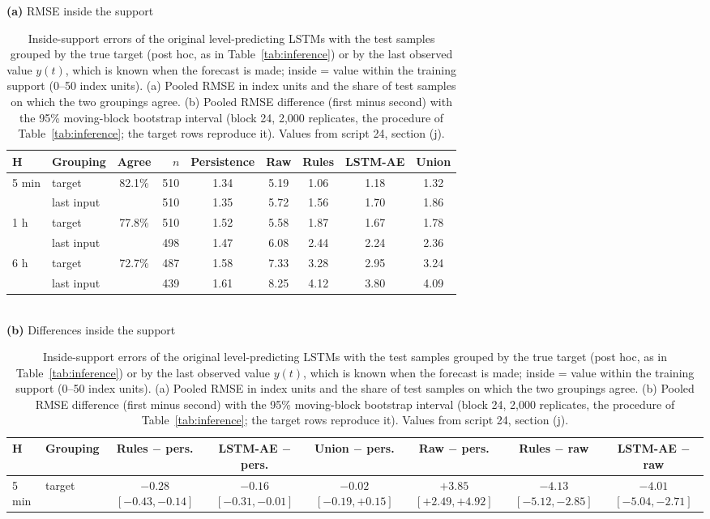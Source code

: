 \begin{table}[!ht]
\centering
\small
\caption{Inside-support errors of the original level-predicting LSTMs with the test samples grouped by the true target (post hoc, as in Table~\ref{tab:inference}) or by the last observed value $y(t)$, which is known when the forecast is made; inside = value within the training support (0--50 index units). (a) Pooled RMSE in index units and the share of test samples on which the two groupings agree. (b) Pooled RMSE difference (first minus second) with the 95\% moving-block bootstrap interval (block 24, 2,000 replicates, the procedure of Table~\ref{tab:inference}; the target rows reproduce it). Values from script 24, section (j).}
\label{tab:opsplit}
\setlength{\tabcolsep}{4pt}
\textbf{(a)} RMSE inside the support\\[2pt]
\begin{tabular}{llcrccccc}
\toprule
\textbf{H} & \textbf{Grouping} & \textbf{Agree} & $n$ & \textbf{Persistence} & \textbf{Raw} & \textbf{Rules} & \textbf{LSTM-AE} & \textbf{Union} \\
\midrule
5 min & target & 82.1\% & 510 & 1.34 & 5.19 & 1.06 & 1.18 & 1.32 \\
 & last input &  & 510 & 1.35 & 5.72 & 1.56 & 1.70 & 1.86 \\
\midrule
1 h & target & 77.8\% & 510 & 1.52 & 5.58 & 1.87 & 1.67 & 1.78 \\
 & last input &  & 498 & 1.47 & 6.08 & 2.44 & 2.24 & 2.36 \\
\midrule
6 h & target & 72.7\% & 487 & 1.58 & 7.33 & 3.28 & 2.95 & 3.24 \\
 & last input &  & 439 & 1.61 & 8.25 & 4.12 & 3.80 & 4.09 \\
\bottomrule
\end{tabular}
\\[8pt]
\textbf{(b)} Differences inside the support\\[2pt]
\begin{tabular}{llcccccc}
\toprule
\textbf{H} & \textbf{Grouping} & \shortstack{Rules\\$-$ pers.} & \shortstack{LSTM-AE\\$-$ pers.} & \shortstack{Union\\$-$ pers.} & \shortstack{Raw\\$-$ pers.} & \shortstack{Rules\\$-$ raw} & \shortstack{LSTM-AE\\$-$ raw} \\
\midrule
5 min & target & \shortstack{$-0.28$\\{\scriptsize $[-0.43, -0.14]$}} & \shortstack{$-0.16$\\{\scriptsize $[-0.31, -0.01]$}} & \shortstack{$-0.02$\\{\scriptsize $[-0.19, +0.15]$}} & \shortstack{$+3.85$\\{\scriptsize $[+2.49, +4.92]$}} & \shortstack{$-4.13$\\{\scriptsize $[-5.12, -2.85]$}} & \shortstack{$-4.01$\\{\scriptsize $[-5.04, -2.71]$}} \\[2pt]

\end{tabular}
\end{table}

